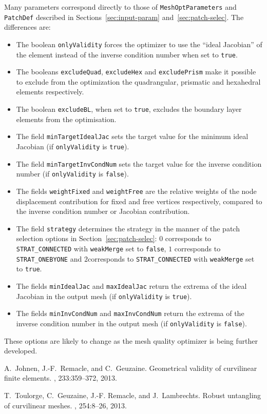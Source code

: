 \documentclass[12pt,a4paper,a4wide]{article}
\begin{document}
Many parameters correspond directly to those of
\texttt{MeshOptParameters} and \texttt{PatchDef} described in
Sections~\ref{sec:input-param} and~\ref{sec:patch-selec}. The
differences are:
\begin{itemize}
\item The boolean \texttt{onlyValidity} forces the optimizer to
use the ``ideal Jacobian'' of the element instead of the inverse
condition number when set to \texttt{true}.
\item The booleans \texttt{excludeQuad}, \texttt{excludeHex} and
\texttt{excludePrism} make it possible to exclude from the
optimization the quadrangular, prismatic and hexahedral elements
respectively.
\item The boolean \texttt{excludeBL}, when set to \texttt{true},
excludes the boundary layer elements from the optimisation.
\item The field \texttt{minTargetIdealJac} sets the target value
for the minimum ideal Jacobian (if \texttt{onlyValidity} is
\texttt{true}).
\item The field \texttt{minTargetInvCondNum} sets the target
value for the inverse condition number (if \texttt{onlyValidity}
is \texttt{false}).
\item The fields \texttt{weightFixed} and \texttt{weightFree} are
the relative weights of the node displacement contribution for
fixed and free vertices respectively, compared to the inverse
condition number or Jacobian contribution.
\item The field \texttt{strategy} determines the strategy in the
manner of the patch selection options in
Section~\ref{sec:patch-selec}: $0$ corresponds to
\texttt{STRAT\_CONNECTED} with \texttt{weakMerge} set to
\texttt{false}, $1$ corresponds to \texttt{STRAT\_ONEBYONE}
and $2$corresponds to \texttt{STRAT\_CONNECTED} with
\texttt{weakMerge} set to \texttt{true}.
\item The fields \texttt{minIdealJac} and \texttt{maxIdealJac}
return the extrema of the ideal Jacobian in the output mesh
(if \texttt{onlyValidity} is \texttt{true}).
\item The fields \texttt{minInvCondNum} and
\texttt{maxInvCondNum} return the extrema of the inverse condition
number in the output mesh (if \texttt{onlyValidity} is
\texttt{false}).
\end{itemize}

These options are likely to change as the mesh quality optimizer
is being further developed.

%
%


\begin{thebibliography}{2}

A.~Johnen, J.-F.~Remacle, and C.~Geuzaine.
\newblock Geometrical validity of curvilinear finite elements.
, 233:359--372, 2013.

T.~Toulorge, C.~Geuzaine, J.-F. Remacle, and J.~Lambrechts.
\newblock Robust untangling of curvilinear meshes.
, 254:8--26, 2013.

\end{thebibliography}
\end{document}
